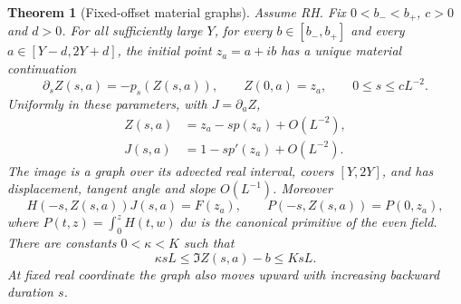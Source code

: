 \documentclass[11pt]{article}
\newcommand{\dd}{\,d}
\newtheorem{theorem}{Theorem}[section]
\theoremstyle{remark}
\begin{document}
\begin{theorem}[Fixed-offset material graphs]\label{scf-flow-theorem}
Assume RH.  Fix $0<b_-<b_+$, $c>0$ and $d>0$.
For all sufficiently large $Y$, for every $b\in[b_-,b_+]$ and every
$a\in[Y-d,2Y+d]$, the initial point $z_a=a+ib$ has a unique material
continuation
\begin{equation}\label{scf-flow}
 \partial_s Z(s,a)=-p_s(Z(s,a)),\qquad Z(0,a)=z_a,
 \qquad 0\le s\le cL^{-2}.
\end{equation}
Uniformly in these parameters, with $J=\partial_a Z$,
\begin{align}
 Z(s,a)&=z_a-sp(z_a)+O(L^{-2}),\label{scf-position-expansion}\\
 J(s,a)&=1-sp'(z_a)+O(L^{-2}).\label{scf-tangent-expansion}
\end{align}
The image is a graph over its advected real interval, covers $[Y,2Y]$,
and has displacement, tangent angle and slope $O(L^{-1})$.
Moreover
\begin{equation}\label{scf-material}
 H(-s,Z(s,a))J(s,a)=F(z_a),\qquad
 P(-s,Z(s,a))=P(0,z_a),
\end{equation}
where $P(t,z)=\int_0^z H(t,w)\,\dd w$ is the canonical primitive of
the even field.  There are constants $0<\kappa<K$ such that
\begin{equation}\label{scf-upward}
 \kappa sL\le\Im Z(s,a)-b\le KsL.
\end{equation}
At fixed real coordinate the graph also moves upward with increasing
backward duration $s$.
\end{theorem}
\end{document}
